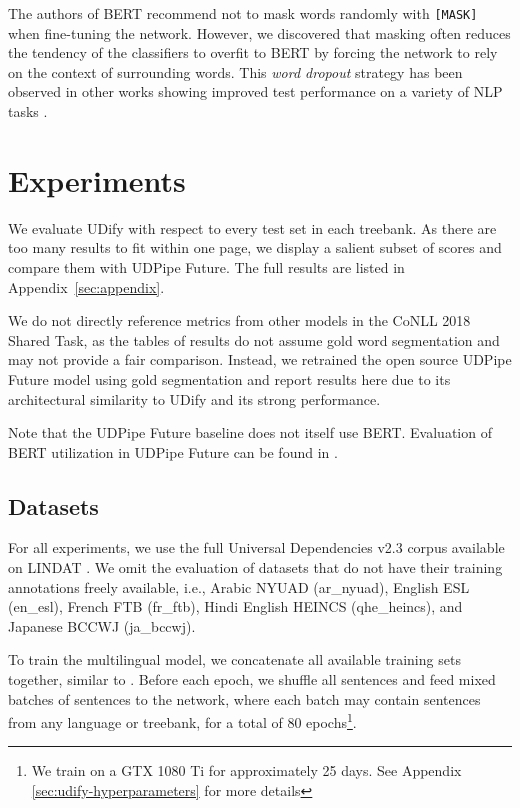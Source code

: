\documentclass[11pt,a4paper]{article}
\begin{document}
The authors of BERT recommend not to mask words randomly with {\tt [MASK]} when fine-tuning the network.
However, we discovered that masking often reduces the tendency of the classifiers to overfit to BERT by forcing the network to rely on the context of surrounding words.
This {\it word dropout} strategy has been observed in other works showing improved test performance on a variety of NLP tasks \cite{iyyer2015deep, bowman2016generating, clark2018semi, straka:2018:K18-2}.

\section{Experiments}

We evaluate UDify with respect to every test set in each treebank.
As there are too many results to fit within one page, we display a salient subset of scores and compare them with UDPipe Future.
The full results are listed in Appendix~\ref{sec:appendix}.

We do not directly reference metrics from other models in the CoNLL 2018 Shared Task, as the tables of results do not assume gold word segmentation and may not provide a fair comparison.
Instead, we retrained the open source UDPipe Future model using gold segmentation and report results here due to its architectural similarity to UDify and its strong performance.

Note that the UDPipe Future baseline does not itself use BERT. Evaluation of BERT utilization in UDPipe Future can be found in \citet{udpipe_bert}.

\subsection{Datasets}

For all experiments, we use the full Universal Dependencies v2.3 corpus available on LINDAT \cite{11234/1-2895}.
We omit the evaluation of datasets that do not have their training annotations freely available, i.e., Arabic NYUAD (ar\_nyuad), English ESL (en\_esl), French FTB (fr\_ftb), Hindi English HEINCS (qhe\_heincs), and Japanese BCCWJ (ja\_bccwj).

To train the multilingual model, we concatenate all available training sets together, similar to .
Before each epoch, we shuffle all sentences and feed mixed batches of sentences to the network, where each batch may contain sentences from any language or treebank, for a total of 80 epochs\footnote{
We train on a GTX 1080 Ti for approximately 25 days. See Appendix \ref{sec:udify-hyperparameters} for more details}.
\end{document}
